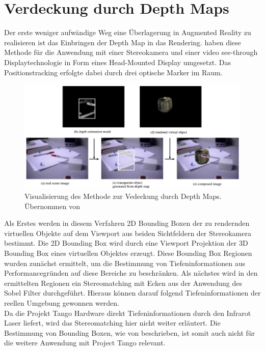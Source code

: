 \section{Verdeckung durch Depth Maps}

Der erste weniger aufwändige Weg eine Überlagerung in Augmented Reality zu realisieren ist das Einbringen der Depth Map in das Rendering. \citet{kanbara2000stereoscopic} haben diese Methode für die Anwendung mit einer Stereokamera und einer video see-through Displaytechnologie in Form eines Head-Mounted Display umgesetzt. Das Positionstracking erfolgte dabei durch drei optische Marker im Raum. \\

\begin{figure}[h]
  \centering
	\includegraphics[width=1.0\textwidth]{content/images/methods/stereo-depth-map.png} 
  \caption{Visualisierung des Methode zur Vedeckung durch Depth Maps. Übernommen von \citet{kanbara2000stereoscopic}}
  \label{fig:stereo-depth-map}
\end{figure}

Als Erstes werden in diesem Verfahren 2D Bounding Boxen der zu rendernden virtuellen Objekte auf dem Viewport aus beiden Sichtfeldern der Stereokamera bestimmt. Die 2D Bounding Box wird durch eine Viewport Projektion der 3D Bounding Box eines virtuellen Objektes erzeugt. Diese Bounding Box Regionen wurden zunächst ermittelt, um die Bestimmung von Tiefeninformationen aus Performancegründen auf diese Bereiche zu beschränken. Als nächstes wird in den ermittelten Regionen ein Stereomatching mit Ecken aus der Anwendung des Sobel Filter durchgeführt. Hieraus können darauf folgend Tiefeninformationen der reellen Umgebung gewonnen werden. \citep{kanbara2000stereoscopic} \\

Da die Projekt Tango Hardware direkt Tiefeninformationen durch den Infrarot Laser liefert, wird das Stereomatching hier nicht weiter erläutert. Die Bestimmung von Bounding Boxen, wie von \citet{kanbara2000stereoscopic} beschrieben, ist somit auch nicht für die weitere Anwendung mit Project Tango relevant.\\


